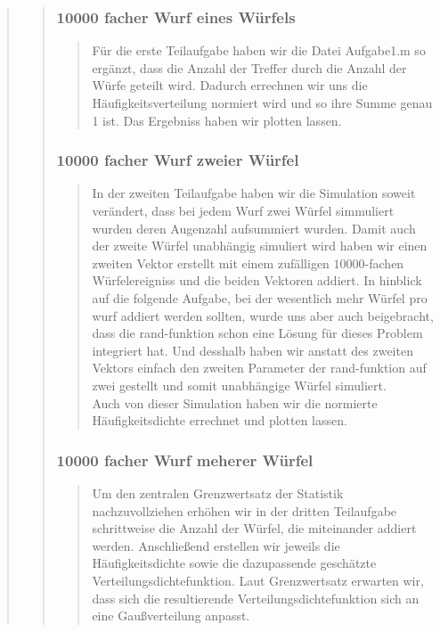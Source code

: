 \begin{quote}
\begin{quote}
        \subsubsection{10000 facher  Wurf eines Würfels}
        \begin{quote}
            Für die erste Teilaufgabe haben wir die Datei Aufgabe1.m so ergänzt, dass die Anzahl der Treffer durch die
            Anzahl der Würfe geteilt wird. Dadurch errechnen wir uns die Häufigkeitsverteilung normiert wird und so ihre
            Summe genau 1 ist. Das Ergebniss haben wir plotten lassen.

        \end{quote}
        
        \subsubsection{10000 facher Wurf zweier Würfel}
        \begin{quote}
            In der zweiten Teilaufgabe haben wir die Simulation soweit verändert, dass bei jedem Wurf zwei Würfel
            simmuliert wurden deren Augenzahl aufsummiert wurden. Damit auch der zweite Würfel unabhängig simuliert wird haben wir einen zweiten Vektor
            erstellt mit einem zufälligen $10000$-fachen Würfelereigniss und die beiden Vektoren addiert. In hinblick auf die
            folgende Aufgabe, bei der wesentlich mehr Würfel pro wurf addiert werden sollten, wurde uns aber auch beigebracht,
            dass die rand-funktion schon eine Lösung für dieses Problem integriert hat. Und desshalb haben wir anstatt des
            zweiten Vektors einfach den zweiten Parameter der rand-funktion auf zwei gestellt und somit unabhängige Würfel
            simuliert.\\
            Auch von dieser Simulation haben wir die normierte Häufigkeitsdichte errechnet und
            plotten lassen.\\
        \end{quote}
        
        \subsubsection{10000 facher Wurf meherer Würfel}
        \begin{quote}
            Um den zentralen Grenzwertsatz der Statistik nachzuvollziehen erhöhen wir in der dritten Teilaufgabe
            schrittweise die Anzahl der Würfel, die miteinander addiert werden. Anschließend erstellen wir jeweils die
            Häufigkeitsdichte sowie die dazupassende geschätzte Verteilungsdichtefunktion.
            Laut Grenzwertsatz erwarten wir, dass sich die resultierende Verteilungsdichtefunktion sich an eine Gaußverteilung anpasst.
        \end{quote}        
    \end{quote}
	

\end{quote}
